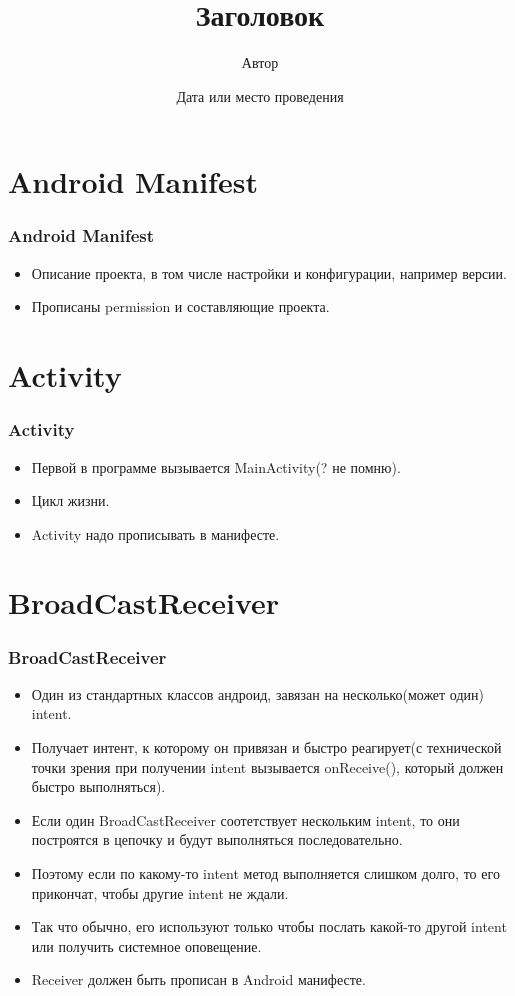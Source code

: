 \documentclass[utf8]{beamer}
\title{Заголовок}
\date{Дата или место проведения}
\author{Автор}
\begin{document}
\begin{frame}
    \titlepage
\end{frame}

\section{Android Manifest}
\begin{frame}
    \frametitle{Android Manifest}
    \begin{itemize}
    	\item Описание проекта, в том числе настройки и конфигурации, например версии.
    	\item Прописаны permission и составляющие проекта.
    \end{itemize}
\end{frame}

\section{Activity}
\begin{frame}
    \frametitle{Activity}
    \begin{itemize}
    	\item Первой в программе вызывается MainActivity(? не помню).
    	\item Цикл жизни.
   		\item Activity надо прописывать в манифесте.
   	\end{itemize}
\end{frame}

\section{BroadCastReceiver}
\begin{frame}
    \frametitle{BroadCastReceiver}
    \begin{itemize}
        \item Один из стандартных классов андроид, завязан на несколько(может один) intent. 
	    \item Получает интент, к которому он привязан и \alert{быстро} реагирует(с технической точки зрения при получении intent вызывается onReceive(), который должен быстро выполняться).
		\item Если один BroadCastReceiver соотетствует нескольким intent, то они построятся в цепочку и будут выполняться последовательно.
		\item Поэтому если по какому-то intent метод выполняется слишком долго, то его прикончат, чтобы другие intent не ждали.
		\item Так что обычно, его используют только чтобы послать какой-то другой intent или получить системное оповещение.
 		\item Receiver должен быть прописан в Android манифесте.
    \end{itemize}
\end{frame}
\end{document}
